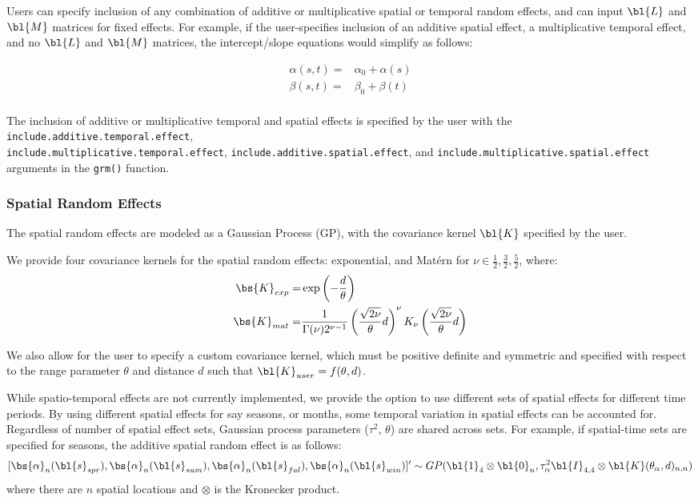 Users can specify inclusion of any combination of additive or multiplicative spatial or temporal random effects, and can input $\bl{L}$ and $\bl{M}$ matrices for fixed effects.
For example, if the user-specifies inclusion of an additive spatial effect, a multiplicative temporal effect, and no $\bl{L}$ and $\bl{M}$ matrices, the intercept/slope equations would simplify as follows:

\begin{align*}
    \alpha(s, t) =& \alpha_0 + \alpha(s)\\
    \beta(s, t) =& \beta_0 + \beta(t) \\
\end{align*} 

The inclusion of additive or multiplicative temporal and spatial effects is specified by the user with the \texttt{include.additive.temporal.effect}, \\ \texttt{include.multiplicative.temporal.effect}, \texttt{include.additive.spatial.effect}, and \texttt{include.multiplicative.spatial.effect} arguments in the \texttt{grm()} function.

\subsubsection*{Spatial Random Effects}

The spatial random effects are modeled as a Gaussian Process (GP), with the covariance kernel $\bl{K}$ specified by the user. 

We provide four covariance kernels for the spatial random effects: exponential, and Mat\'{e}rn for $\nu \in {\frac{1}{2}, \frac{3}{2}, \frac{5}{2}}$, where:
\begin{align*}
    \bs{K}_{exp} =& \exp \left( - \frac{d}{\theta} \right) \\
    \bs{K}_{mat} =& \frac{1}{\Gamma(\nu) 2^{\nu - 1}} \left( \frac{\sqrt{2 \nu}}{\theta} d \right)^{\nu} K_{\nu} \left( \frac{\sqrt{2 \nu}}{\theta} d \right) \\
\end{align*} 

We also allow for the user to specify a custom covariance kernel, which must be positive definite and symmetric and specified with respect to the range parameter $\theta$ and distance $d$ such that $\bl{K}_{user} = f(\theta, d)$. 

While spatio-temporal effects are not currently implemented, we provide the option to use different sets of spatial effects for different time periods. 
By using different spatial effects for say seasons, or months, some temporal variation in spatial effects can be accounted for.
Regardless of number of spatial effect sets, Gaussian process parameters ($\tau^2$, $\theta$) are shared across sets. 
For example, if spatial-time sets are specified for seasons, the additive spatial random effect is as follows:
\[
    [\bs{\alpha}_n(\bl{s}_{spr}), 
        \bs{\alpha}_n(\bl{s}_{sum}),
        \bs{\alpha}_n(\bl{s}_{fal}),
        \bs{\alpha}_n(\bl{s}_{win})]' \sim GP(\bl{1}_4 \otimes \bl{0}_n, \tau_{\alpha}^2 \bl{I}_{4,4} \otimes \bl{K}(\theta_{\alpha}, d)_{n,n})
\]
where there are $n$ spatial locations and $\otimes$ is the Kronecker product.

